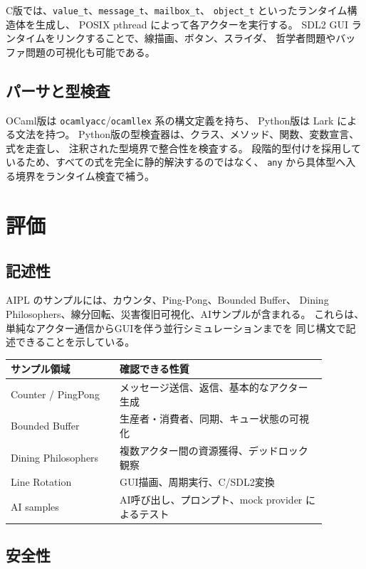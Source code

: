 \documentclass[11pt,a4paper,uplatex,dvipdfmx]{jsarticle}
\newcommand{\code}[1]{\texttt{#1}}
\begin{document}
C版では、\code{value\_t}、\code{message\_t}、\code{mailbox\_t}、
\code{object\_t} といったランタイム構造体を生成し、
POSIX pthread によって各アクターを実行する。
SDL2 GUI ランタイムをリンクすることで、線描画、ボタン、スライダ、
哲学者問題やバッファ問題の可視化も可能である。

\subsection{パーサと型検査}

OCaml版は \code{ocamlyacc}/\code{ocamllex} 系の構文定義を持ち、
Python版は Lark による文法を持つ。
Python版の型検査器は、クラス、メソッド、関数、変数宣言、式を走査し、
注釈された型境界で整合性を検査する。
段階的型付けを採用しているため、すべての式を完全に静的解決するのではなく、
\code{any} から具体型へ入る境界をランタイム検査で補う。

\section{評価}

\subsection{記述性}

AIPL のサンプルには、カウンタ、Ping-Pong、Bounded Buffer、
Dining Philosophers、線分回転、災害復旧可視化、AIサンプルが含まれる。
これらは、単純なアクター通信からGUIを伴う並行シミュレーションまでを
同じ構文で記述できることを示している。

\begin{longtable}{p{0.30\linewidth}p{0.58\linewidth}}
\toprule
サンプル領域 & 確認できる性質 \\
\midrule
Counter / PingPong & メッセージ送信、返信、基本的なアクター生成 \\
Bounded Buffer & 生産者・消費者、同期、キュー状態の可視化 \\
Dining Philosophers & 複数アクター間の資源獲得、デッドロック観察 \\
Line Rotation & GUI描画、周期実行、C/SDL2変換 \\
AI samples & AI呼び出し、プロンプト、mock provider によるテスト \\
\bottomrule
\end{longtable}

\subsection{安全性}
\end{document}
